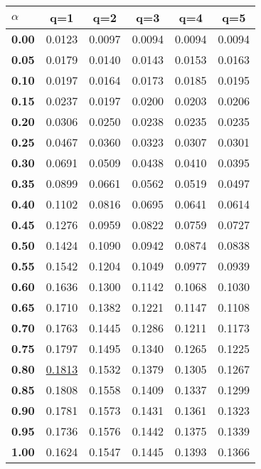 \begin{tabular}{ | l || c | c | c | c | c |}
\hline
\textbf{$\alpha$} & \textbf{q=1} & \textbf{q=2} & \textbf{q=3} & \textbf{q=4} & \textbf{q=5} \\
\hline
\textbf{0.00} & 0.0123 & 0.0097 & 0.0094 & 0.0094 & 0.0094\\
\hline
\textbf{0.05} & 0.0179 & 0.0140 & 0.0143 & 0.0153 & 0.0163\\
\hline
\textbf{0.10} & 0.0197 & 0.0164 & 0.0173 & 0.0185 & 0.0195\\
\hline
\textbf{0.15} & 0.0237 & 0.0197 & 0.0200 & 0.0203 & 0.0206\\
\hline
\textbf{0.20} & 0.0306 & 0.0250 & 0.0238 & 0.0235 & 0.0235\\
\hline
\textbf{0.25} & 0.0467 & 0.0360 & 0.0323 & 0.0307 & 0.0301\\
\hline
\textbf{0.30} & 0.0691 & 0.0509 & 0.0438 & 0.0410 & 0.0395\\
\hline
\textbf{0.35} & 0.0899 & 0.0661 & 0.0562 & 0.0519 & 0.0497\\
\hline
\textbf{0.40} & 0.1102 & 0.0816 & 0.0695 & 0.0641 & 0.0614\\
\hline
\textbf{0.45} & 0.1276 & 0.0959 & 0.0822 & 0.0759 & 0.0727\\
\hline
\textbf{0.50} & 0.1424 & 0.1090 & 0.0942 & 0.0874 & 0.0838\\
\hline
\textbf{0.55} & 0.1542 & 0.1204 & 0.1049 & 0.0977 & 0.0939\\
\hline
\textbf{0.60} & 0.1636 & 0.1300 & 0.1142 & 0.1068 & 0.1030\\
\hline
\textbf{0.65} & 0.1710 & 0.1382 & 0.1221 & 0.1147 & 0.1108\\
\hline
\textbf{0.70} & 0.1763 & 0.1445 & 0.1286 & 0.1211 & 0.1173\\
\hline
\textbf{0.75} & 0.1797 & 0.1495 & 0.1340 & 0.1265 & 0.1225\\
\hline
\textbf{0.80} & \underline{0.1813} & 0.1532 & 0.1379 & 0.1305 & 0.1267\\
\hline
\textbf{0.85} & 0.1808 & 0.1558 & 0.1409 & 0.1337 & 0.1299\\
\hline
\textbf{0.90} & 0.1781 & 0.1573 & 0.1431 & 0.1361 & 0.1323\\
\hline
\textbf{0.95} & 0.1736 & 0.1576 & 0.1442 & 0.1375 & 0.1339\\
\hline
\textbf{1.00} & 0.1624 & 0.1547 & 0.1445 & 0.1393 & 0.1366\\
\hline
\end{tabular}
